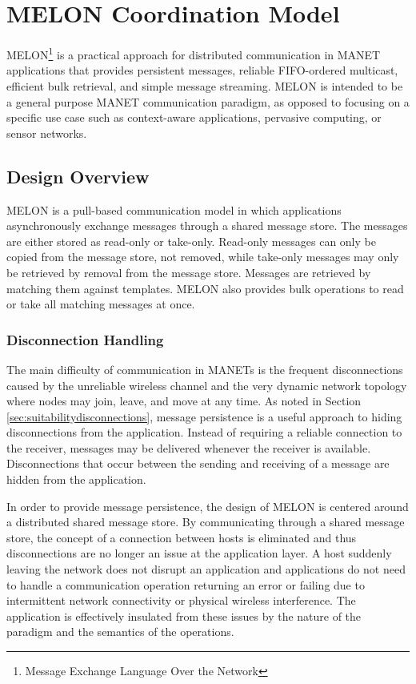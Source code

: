\chapter{MELON Coordination Model}\label{chapter:model}

MELON\footnote{Message Exchange Language Over the Network} is a practical approach for distributed communication in MANET applications that provides persistent messages, reliable FIFO-ordered multicast, efficient bulk retrieval, and simple message streaming. MELON is intended to be a general purpose MANET communication paradigm, as opposed to focusing on a specific use case such as context-aware applications, pervasive computing, or sensor networks. 

\section{Design Overview}

MELON is a pull-based communication model in which applications asynchronously exchange messages through a shared message store. The messages are either stored as read-only or take-only. Read-only messages can only be copied from the message store, not removed, while take-only messages may only be retrieved by removal from the message store. Messages are retrieved by matching them against templates. MELON also provides bulk operations to read or take all matching messages at once.

\subsection{Disconnection Handling}

The main difficulty of communication in MANETs is the frequent disconnections caused by the unreliable wireless channel and the very dynamic network topology where nodes may join, leave, and move at any time. As noted in Section \ref{sec:suitabilitydisconnections}, message persistence is a useful approach to hiding disconnections from the application. Instead of requiring a reliable connection to the receiver, messages may be delivered whenever the receiver is available. Disconnections that occur between the sending and receiving of a message are hidden from the application.

In order to provide message persistence, the design of MELON is centered around a distributed shared message store. By communicating through a shared message store, the concept of a connection between hosts is eliminated and thus disconnections are no longer an issue at the application layer. A host suddenly leaving the network does not disrupt an application and applications do not need to handle a communication operation returning an error or failing due to intermittent network connectivity or physical wireless interference. The application is effectively insulated from these issues by the nature of the paradigm and the semantics of the operations.

